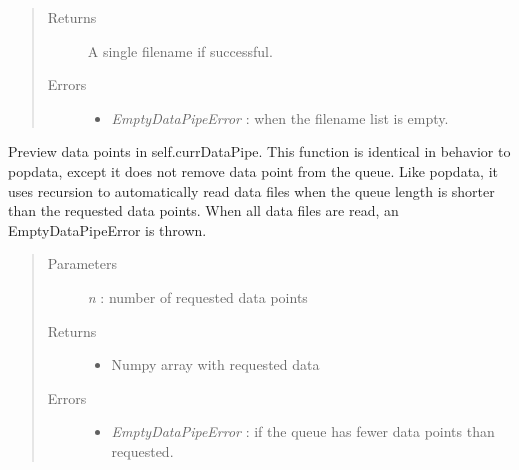 \documentclass[letterpaper,10pt,english]{sphinxmanual}
\begin{document}
\begin{fulllineitems}
\begin{fulllineitems}
\begin{quote}
\begin{description}
\begin{itemize}
\end{itemize}

\item[{Returns}] \leavevmode
A single filename if successful.

\item[{Errors}] \leavevmode\begin{itemize}
\item {} 
\emph{EmptyDataPipeError} : when the filename list is empty.

\end{itemize}

\end{description}\end{quote}

\end{fulllineitems}


\begin{fulllineitems}
\label{api-doc/mosaic.meta:mosaic.metaTrajIO.metaTrajIO.previewdata}
Preview data points in self.currDataPipe. This function is identical in 
behavior to popdata, except it does not remove data point from the queue.
Like popdata, it uses recursion to automatically read data files 
when the queue length is shorter than the requested data points. When all 
data files are read, an EmptyDataPipeError is thrown.
\begin{quote}\begin{description}
\item[{Parameters}] \leavevmode
\emph{n} : number of requested data points

\item[{Returns}] \leavevmode\begin{itemize}
\item {} 
Numpy array with requested data

\end{itemize}

\item[{Errors}] \leavevmode\begin{itemize}
\item {} 
\emph{EmptyDataPipeError} : if the queue has fewer data points than requested.

\end{itemize}

\end{description}\end{quote}


\end{fulllineitems}
\end{fulllineitems}
\end{document}
